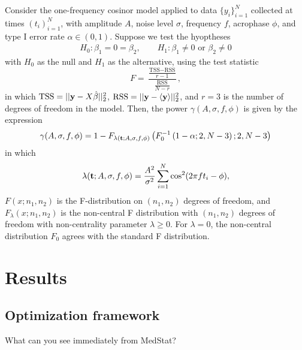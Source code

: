 \documentclass{article}
\begin{document}
\begin{theorem}
  \label{thm:circapower}
Consider the one-frequency cosinor model applied to data $\{y_i\}_{i=1}^{N}$ collected at times $(t_i)_{i=1}^{N}$, with amplitude $A$, noise level $\sigma$, frequency $f$, acrophase $\phi$, and type I error rate $\alpha\in (0,1)$. Suppose we test the hyoptheses
\begin{align}
    H_0 : \beta_1=0=\beta_2, \quad\quad H_1 : \beta_1\neq0 \textrm{ or } \beta_2 \neq 0 
\end{align}
with $H_0$ as the null and $H_1$ as the alternative, using the test statistic
\begin{equation}
F = \frac{ \frac{\textrm{TSS} - \textrm{RSS}}{r-1} }{ \frac{\textrm{RSS}}{N-r}},
\end{equation}
in which $\textrm{TSS} = || \mathbf{y} - X\hat{\beta}||_2^2$, $\textrm{RSS} =  ||\mathbf{y}-\langle\mathbf{y} \rangle||_2^2$, and $r=3$ is the number of degrees of freedom in the model. Then, the power $\gamma(A,\sigma,f,\phi)$ is given by the expression
\begin{align}
  \gamma(A,\sigma,f,\phi)=1- F_{\lambda(\mathbf{t};A,\sigma,f,\phi)}\left(F_0^{-1}\left( 1-\alpha;2,N-3\right);2,N-3\right) \label{eqn:cpower}
\end{align}
in which
\begin{align}
\lambda(\mathbf{t};A,\sigma,f,\phi)=\frac{A^2}{\sigma^2}\sum_{i=1}^{N}  \cos^2(2\pi ft_i - \phi),\label{eqn:lambda}
\end{align}
$F(x;n_1,n_2)$ is the F-distribution on $(n_1,n_2)$ degrees of freedom, and $F_\lambda(x;n_1,n_2)$ is the non-central F distribution with $(n_1,n_2)$ degrees of freedom with non-centrality parameter $\lambda\geq 0$. For $\lambda=0$, the non-central distribution $F_0$ agrees with the standard F distribution.
\end{theorem}

\section{Results}
\subsection{Optimization framework}
What can you see immediately from MedStat?
\end{document}
